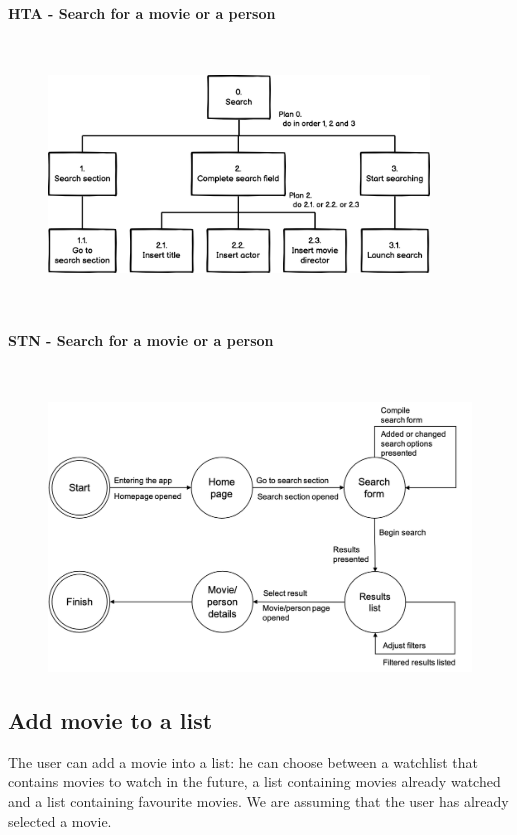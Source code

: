 \documentclass[12pt, a4paper]{article}
\numberwithin{figure}{section}
\begin{document}
\paragraph{HTA - Search for a movie or a person}\mbox{}\\
\begin{figure}[H]
	\centering
	\includegraphics[width=0.9\textwidth]{images/Search HTA.png}\\
\end{figure}
\mbox{}\\
\paragraph{STN - Search for a movie or a person}\mbox{}\\
\begin{figure}[H]
	\centering
	\includegraphics[width=1\textwidth]{images/SearchSTN.png}\\
\end{figure}

\subsection{Add movie to a list}
The user can add a movie into a list: he can choose between a watchlist that contains movies to watch
in the future, a list containing movies already watched and a list containing favourite movies.
We are assuming that the user has already selected a movie.
\end{document}
